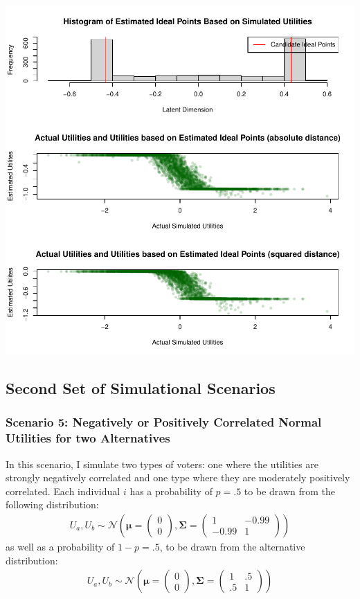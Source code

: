 \documentclass[12pt]{article}\usepackage[]{graphicx}\usepackage[]{color}
\makeatletter
\def\maxwidth{ %
  \ifdim\Gin@nat@width>\linewidth
    \linewidth
  \else
    \Gin@nat@width
  \fi
}
\newenvironment{knitrout}{}{} %
\makeatother
\begin{document}
\begin{knitrout}
\includegraphics[width=\maxwidth]{figure/unnamed-chunk-92} 

\end{knitrout}


\clearpage
\subsection*{Second Set of Simulational Scenarios}
\subsubsection*{Scenario 5: Negatively or Positively Correlated Normal Utilities for two Alternatives}
In this scenario, I simulate two types of voters: one where the utilities are strongly negatively correlated and one type where they are moderately positively correlated. Each individual $i$ has a probability of $p=.5$ to be drawn from the following distribution:
\begin{align*}
U_a,U_b \sim \mathcal{N}\left(
\boldsymbol{\mu}=\begin{pmatrix}0 \\ 0\end{pmatrix},
\mathbf{\Sigma}=\begin{pmatrix}1 & -0.99 \\ -0.99 & 1\end{pmatrix}\right)
\end{align*}
as well as a probability of $1-p=.5$, to be drawn from the alternative distribution:
\begin{align*}
U_a,U_b \sim \mathcal{N}\left(
\boldsymbol{\mu}=\begin{pmatrix}0 \\ 0\end{pmatrix},
\mathbf{\Sigma}=\begin{pmatrix}1 & .5 \\ .5 & 1\end{pmatrix}\right)
\end{align*}
\end{document}
